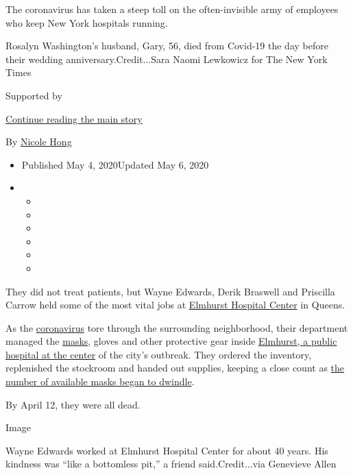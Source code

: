The coronavirus has taken a steep toll on the often-invisible army of
employees who keep New York hospitals running.

Rosalyn Washington's husband, Gary, 56, died from Covid-19 the day
before their wedding anniversary.Credit...Sara Naomi Lewkowicz for The
New York Times

Supported by

\protect\hyperlink{after-sponsor}{Continue reading the main story}

By \href{https://www.nytimes.com/by/nicole-hong}{Nicole Hong}

\begin{itemize}
\item
  Published May 4, 2020Updated May 6, 2020
\item
  \begin{itemize}
  \item
  \item
  \item
  \item
  \item
  \item
  \end{itemize}
\end{itemize}

They did not treat patients, but Wayne Edwards, Derik Braswell and
Priscilla Carrow held some of the most vital jobs at
\href{https://www.nytimes.com/2020/05/20/nyregion/hospitals-coronavirus-cases-decline.html}{Elmhurst
Hospital Center} in Queens.

As the
\href{https://www.nytimes.com/2020/05/06/us/politics/coronavirus-masks-tests-ppe.html}{coronavirus}
tore through the surrounding neighborhood, their department managed the
\href{https://www.nytimes.com/2020/05/06/us/politics/coronavirus-masks-tests-ppe.html}{masks},
gloves and other protective gear inside
\href{https://www.nytimes.com/2020/03/25/nyregion/nyc-coronavirus-hospitals.html}{Elmhurst,
a public hospital at the center} of the city's outbreak. They ordered
the inventory, replenished the stockroom and handed out supplies,
keeping a close count as
\href{https://www.nytimes.com/2020/03/19/health/coronavirus-masks-shortage.html}{the
number of available masks began to dwindle}.

By April 12, they were all dead.

Image

Wayne Edwards worked at Elmhurst Hospital Center for about 40 years. His
kindness was ``like a bottomless pit,'' a friend said.Credit...via
Genevieve Allen

